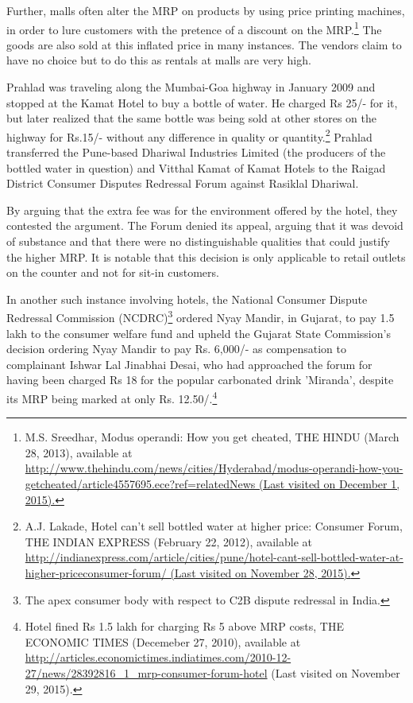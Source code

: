 \begin{multicols}{2}
\vspace{.1cm}

\noi
Further, malls often alter the MRP on products by using price printing machines, in order to
lure customers with the pretence of a discount on the MRP.\footnote{M.S. Sreedhar, Modus operandi: How you get cheated, THE HINDU (March 28, 2013), available at\\  \url{http://www.thehindu.com/news/cities/Hyderabad/modus-operandi-how-you-getcheated/article4557695.ece?ref=relatedNews (Last visited on December 1, 2015).}} The goods are also sold at this
inflated price in many instances. The vendors claim to have no choice but to do this as rentals
at malls are very high.

\vspace{.1cm}

\noi
Prahlad was traveling along the Mumbai-Goa highway in January 2009 and stopped at the
Kamat Hotel to buy a bottle of water. He charged Rs 25/- for it, but later realized that the same
bottle was being sold at other stores on the highway for Rs.15/- without any difference in
quality or quantity.\footnote{ A.J. Lakade, Hotel can’t sell bottled water at higher price: Consumer Forum, THE INDIAN EXPRESS (February 22, 2012), available at \url{http://indianexpress.com/article/cities/pune/hotel-cant-sell-bottled-water-at-higher-priceconsumer-forum/ (Last visited on November 28, 2015).}} Prahlad transferred the Pune-based Dhariwal Industries Limited (the producers of the bottled water in question) and Vitthal Kamat of Kamat Hotels to the Raigad
District Consumer Disputes Redressal Forum against Rasiklal Dhariwal.

\vspace{.1cm}

\noi
By arguing that the extra fee was for the environment offered by the hotel, they contested the
argument. The Forum denied its appeal, arguing that it was devoid of substance and that there
were no distinguishable qualities that could justify the higher MRP. It is notable that this
decision is only applicable to retail outlets on the counter and not for sit-in customers.

\vspace{-.15cm}

\noi
In another such instance involving hotels, the National Consumer Dispute Redressal
Commission (NCDRC)\footnote{The apex consumer body with respect to C2B dispute redressal in India.} ordered Nyay Mandir, in Gujarat, to pay 1.5 lakh to the consumer
welfare fund and upheld the Gujarat State Commission's decision ordering Nyay Mandir to pay
Rs. 6,000/- as compensation to complainant Ishwar Lal Jinabhai Desai, who had approached the forum for having been charged Rs 18 for the popular carbonated drink 'Miranda', despite
its MRP being marked at only Rs. 12.50/.\footnote{Hotel fined Rs 1.5 lakh for charging Rs 5 above MRP costs, THE ECONOMIC TIMES (Decemeber 27, 2010), available at\\ \url{http://articles.economictimes.indiatimes.com/2010-12-27/news/28392816_1_mrp-consumer-forum-hotel} (Last visited on November 29, 2015).}


\end{multicols}
